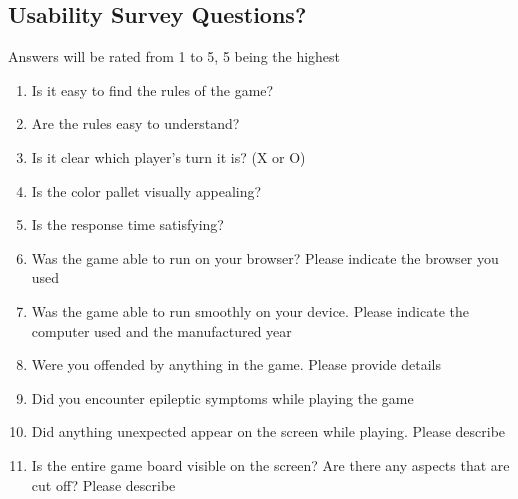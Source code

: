 \documentclass[12pt, titlepage]{article}
\begin{document}
\subsection{Usability Survey Questions?}
Answers will be rated from 1 to 5, 5 being the highest
\begin{enumerate}
\item
Is it easy to find the rules of the game? \label{question:q1}
\item
Are the rules easy to understand? \label{question:q2}
\item
Is it clear which player's turn it is? (X or O) \label{question:q3}
\item
Is the color pallet visually appealing? \label{question:q4}
\item
Is the response time satisfying? \label{question:q5}
\item
Was the game able to run on your browser? Please indicate the browser you used
\label{question:q6}
\item
Was the game able to run smoothly on your device. Please indicate the computer
used and the manufactured year \label{question:q7}
\item
Were you offended by anything in the game. Please provide details \label{question:q8}
\item
Did you encounter epileptic symptoms while playing the game \label{question:q9}
\item
Did anything unexpected appear on the screen while playing. Please describe
\label{question:q10}
\item
Is the entire game board visible on the screen? Are there any aspects that are
cut off? Please describe \label{question:q11}


\end{enumerate}
\end{document}

